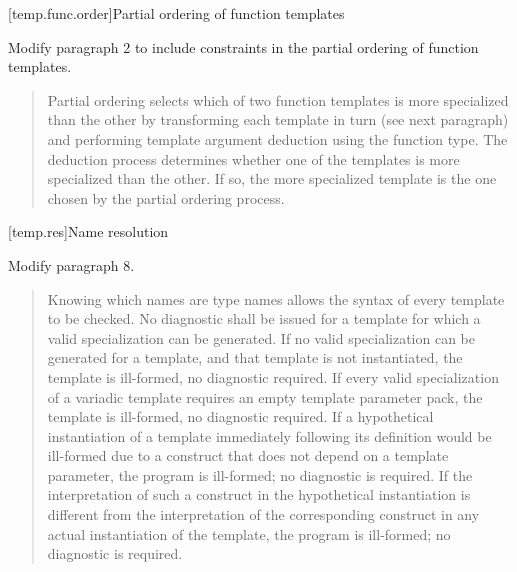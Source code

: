 [temp.func.order]{Partial ordering of function templates}

Modify paragraph 2 to include constraints in the partial ordering
of function templates.

\begin{quote}
\setcounter{Paras}{1}
\pnum
Partial ordering selects which of two function templates is 
more specialized than the other by transforming each template 
in turn (see next paragraph) and performing template argument 
deduction using the function type. The deduction process 
determines whether one of the templates is more specialized 
than the other.
% 
If so, the more specialized template is the one chosen by the 
partial ordering process. 
% 
\end{quote}

[temp.res]{Name resolution}

Modify paragraph 8.

\begin{quote}
\setcounter{Paras}{7}
\pnum
Knowing which names are type names allows the syntax of every
template to be checked. No diagnostic shall be issued for a template
for which a valid specialization can be generated. If no valid
specialization can be generated for a template, and that template is
not instantiated, the template is ill-formed, no diagnostic
required. If every valid specialization of a variadic template
requires an empty template parameter pack, the template is
ill-formed, no diagnostic required. 
% 
% 
% 
If a hypothetical instantiation of a template immediately following
its definition would be ill-formed due to a construct that does not
depend on a template parameter, the program is ill-formed; no
diagnostic is required. If the interpretation of such a construct in
the hypothetical instantiation is different from the interpretation
of the corresponding construct in any actual instantiation of the
template, the program is ill-formed; no diagnostic is required.
\end{quote}

